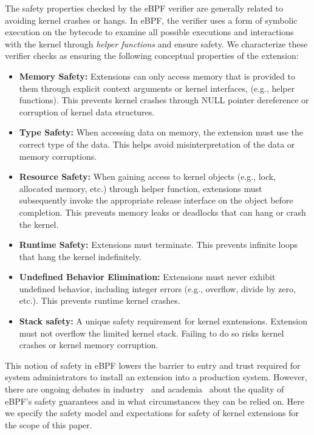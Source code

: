 The safety properties checked by the eBPF verifier are generally
related to avoiding kernel crashes or hangs.  In eBPF, the verifier
uses a form of symbolic execution on the bytecode to examine all
possible executions and interactions with the kernel through {\em
  helper functions} and ensure safety.  We characterize these verifier
checks as ensuring the following conceptual properties of the
extension: 
\begin{itemize}
\item {\bf Memory Safety:} Extensions can only access memory that is
  provided to them through explicit context arguments or kernel
  interfaces, (e.g., helper functions).  This prevents kernel crashes
  through NULL pointer dereference or corruption of kernel data
  structures.
\item {\bf Type Safety:} When accessing data on memory, the extension must use
  the correct type of the data. This helps avoid misinterpretation of the data
  or memory corruptions.
\item {\bf Resource Safety:} When gaining access to kernel objects
  (e.g., lock, allocated memory, etc.) through helper function,
  extensions must subsequently invoke the appropriate release
  interface on the object before completion.  This prevents memory
  leaks or deadlocks that can hang or crash the kernel.
\item {\bf Runtime Safety:} Extensions must terminate. This prevents
  infinite loops that hang the kernel indefinitely.
\item {\bf Undefined Behavior Elimination:} Extensions must never
  exhibit undefined behavior, including integer errors (e.g.,
  overflow, divide by zero, etc.). This prevents runtime kernel
  crashes.
\item {\bf Stack safety:} A unique safety requirement for kernel exntensions.
  Extension must not overflow the limited kernel stack.
  Failing to do so risks kernel crashes or kernel memory corruption.
\end{itemize}

This notion of safety in eBPF lowers the barrier to entry and trust
required for system administrators to install an extension into a
production system.  However, there are ongoing debates in
industry~\cite{unprivileged-ebpf} and
academia~\cite{untenableVerification} about the quality of eBPF's
safety guarantees and in what circumstances they can be relied on.
Here we specify the safety model and expectations for safety of kernel
extensions for the scope of this paper.

